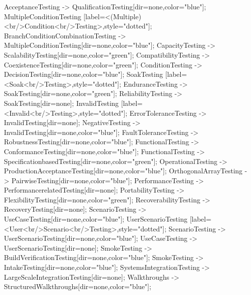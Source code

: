 \documentclass{article}
\begin{document}
{AcceptanceTesting -> QualificationTesting[dir=none,color="blue"];
MultipleConditionTesting [label=<(Multiple)<br/>Condition<br/>Testing>,style="dotted"];
BranchConditionCombinationTesting -> MultipleConditionTesting[dir=none,color="blue"];
CapacityTesting -> ScalabilityTesting[dir=none,color="green"];
CompatibilityTesting -> CoexistenceTesting[dir=none,color="green"];
ConditionTesting -> DecisionTesting[dir=none,color="blue"];
SoakTesting [label=<Soak<br/>Testing>,style="dotted"];
EnduranceTesting -> SoakTesting[dir=none,color="green"];
ReliabilityTesting -> SoakTesting[dir=none];
InvalidTesting [label=<Invalid<br/>Testing>,style="dotted"];
ErrorToleranceTesting -> InvalidTesting[dir=none];
NegativeTesting -> InvalidTesting[dir=none,color="blue"];
FaultToleranceTesting -> RobustnessTesting[dir=none,color="blue"];
FunctionalTesting -> ConformanceTesting[dir=none,color="blue"];
FunctionalTesting -> SpecificationbasedTesting[dir=none,color="green"];
OperationalTesting -> ProductionAcceptanceTesting[dir=none,color="blue"];
OrthogonalArrayTesting -> PairwiseTesting[dir=none,color="blue"];
PerformanceTesting -> PerformancerelatedTesting[dir=none];
PortabilityTesting -> FlexibilityTesting[dir=none,color="green"];
RecoverabilityTesting -> RecoveryTesting[dir=none];
ScenarioTesting -> UseCaseTesting[dir=none,color="blue"];
UserScenarioTesting [label=<User<br/>Scenario<br/>Testing>,style="dotted"];
ScenarioTesting -> UserScenarioTesting[dir=none,color="blue"];
UseCaseTesting -> UserScenarioTesting[dir=none];
SmokeTesting -> BuildVerificationTesting[dir=none,color="blue"];
SmokeTesting -> IntakeTesting[dir=none,color="blue"];
SystemsIntegrationTesting -> LargeScaleIntegrationTesting[dir=none];
Walkthroughs -> StructuredWalkthroughs[dir=none,color="blue"];

}
\end{document}
